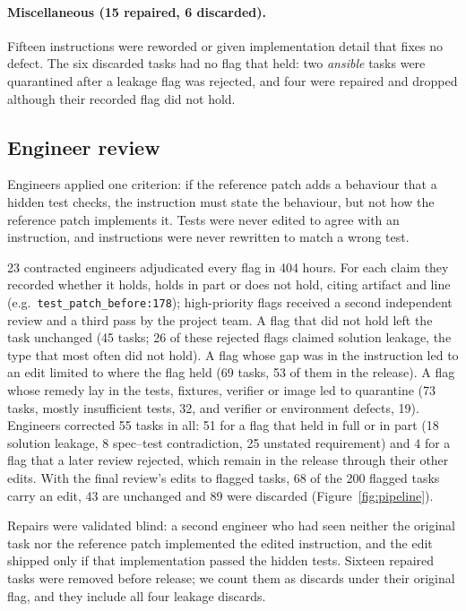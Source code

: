\paragraph{Miscellaneous (15 repaired, 6 discarded).}
Fifteen instructions were reworded or given implementation detail that fixes no defect. The six discarded tasks had no flag that held: two \textit{ansible} tasks were quarantined after a leakage flag was rejected, and four were repaired and dropped although their recorded flag did not hold.


\subsection{Engineer review}
\label{sec:review}

Engineers applied one criterion: if the reference patch adds a behaviour that a hidden test checks, the instruction must state the behaviour, but not how the reference patch implements it. Tests were never edited to agree with an instruction, and instructions were never rewritten to match a wrong test.

23 contracted engineers adjudicated every flag in 404 hours. For each claim they recorded whether it holds, holds in part or does not hold, citing artifact and line (e.g.\ \texttt{test\_patch\_before:178}); high-priority flags received a second independent review and a third pass by the project team. A flag that did not hold left the task unchanged (45 tasks; 26 of these rejected flags claimed solution leakage, the type that most often did not hold). A flag whose gap was in the instruction led to an edit limited to where the flag held (69 tasks, 53 of them in the release). A flag whose remedy lay in the tests, fixtures, verifier or image led to quarantine (73 tasks, mostly insufficient tests, 32, and verifier or environment defects, 19). Engineers corrected 55 tasks in all: 51 for a flag that held in full or in part (18 solution leakage, 8 spec--test contradiction, 25 unstated requirement) and 4 for a flag that a later review rejected, which remain in the release through their other edits. With the final review's edits to flagged tasks, 68 of the 200 flagged tasks carry an edit, 43 are unchanged and 89 were discarded (Figure~\ref{fig:pipeline}).

Repairs were validated blind: a second engineer who had seen neither the original task nor the reference patch implemented the edited instruction, and the edit shipped only if that implementation passed the hidden tests. Sixteen repaired tasks were removed before release; we count them as discards under their original flag, and they include all four leakage discards.

